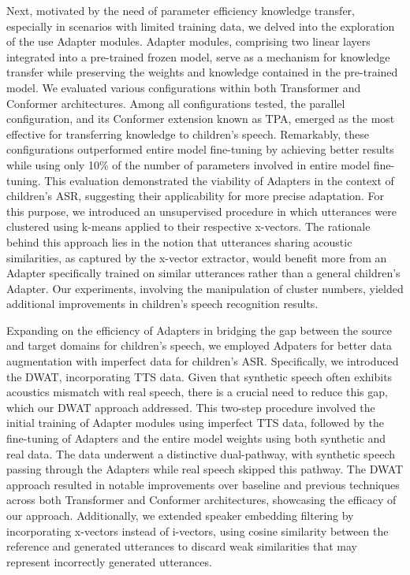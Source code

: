 Next, motivated by the need of parameter efficiency knowledge transfer, especially in scenarios with limited training data, we delved into the exploration of the use Adapter modules. Adapter modules, comprising two linear layers integrated into a pre-trained frozen model, serve as a mechanism for knowledge transfer while preserving the weights and knowledge contained in the pre-trained model. We evaluated various configurations within both Transformer and Conformer architectures. Among all configurations tested, the parallel configuration, and its Conformer extension known as TPA, emerged as the most effective for transferring knowledge to children's speech. Remarkably, these configurations outperformed entire model fine-tuning by achieving better results while using only 10\% of the number of parameters involved in entire model fine-tuning. This evaluation demonstrated the viability of Adapters in the context of children's \ac{ASR}, suggesting their applicability for more precise adaptation. For this purpose, we introduced an unsupervised procedure in which utterances were clustered using k-means applied to their respective x-vectors. The rationale behind this approach lies in the notion that utterances sharing acoustic similarities, as captured by the x-vector extractor, would benefit more from an Adapter specifically trained on similar utterances rather than a general children's Adapter. Our experiments, involving the manipulation of cluster numbers, yielded additional improvements in children's speech recognition results.

Expanding on the efficiency of Adapters in bridging the gap between the source and target domains for children's speech, we employed Adpaters for better data augmentation with imperfect data for children's \ac{ASR}. Specifically, we introduced the \ac{DWAT}, incorporating \ac{TTS} data. Given that synthetic speech often exhibits acoustics mismatch with real speech, there is a crucial need to reduce this gap, which our \ac{DWAT} approach addressed. This two-step procedure involved the initial training of Adapter modules using imperfect \ac{TTS} data, followed by the fine-tuning of Adapters and the entire model weights using both synthetic and real data. The data underwent a distinctive dual-pathway, with synthetic speech passing through the Adapters while real speech skipped this pathway. The \ac{DWAT} approach resulted in notable improvements over baseline and previous techniques across both Transformer and Conformer architectures, showcasing the efficacy of our approach. Additionally, we extended speaker embedding filtering by incorporating x-vectors instead of i-vectors, using cosine similarity between the reference and generated utterances to discard weak similarities that may represent incorrectly generated utterances.

